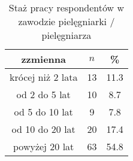 \begin{table}[H]
\caption{Staż pracy respondentów w zawodzie pielęgniarki / pielęgniarza}
\centering
\begin{tabular}{ | c | c | c |}
\hline
zzmienna & $n$ & \% \\
\hline
krócej niż 2 lata  &  13  & 11.3\\
\hline
od 2 do 5 lat  &  10  & 8.7 \\
\hline
od 5 do 10 lat  &  9  & 7.8\\
\hline
od 10 do 20 lat  &  20  & 17.4\\
\hline
powyżej 20 lat  &  63  & 54.8 \\
\hline
\end{tabular}
\label{tab:Q1}
\end{table}

